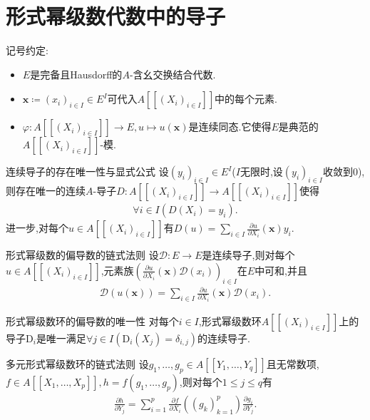 \section{形式幂级数代数中的导子}

记号约定:
\begin{itemize}
	\item $E$是完备且Hausdorff的$A$-含幺交换结合代数.
	\item $\mathbf{x}\coloneq\left(x_{i}\right)_{i\in I}\in E^{I}$可代入$A[[(X_{i})_{i\in I}]]$中的每个元素.
	\item $\varphi:A[[(X_{i})_{i\in I}]]\to E,u\mapsto u\left(\mathbf{x}\right)$是连续同态.它使得$E$是典范的$A[[(X_{i})_{i\in I}]]$-模.
\end{itemize}

\begin{proposition}{连续导子的存在唯一性与显式公式}{}
	设$\left(y_{i}\right)_{i\in I}\in E^{I}$($I$无限时,设$\left(y_{i}\right)_{i\in I}$收敛到$0$),则存在唯一的连续$A$-导子$D:A[[(X_{i})_{i\in I}]]\to A[[(X_{i})_{i\in I}]]$使得
	\begin{align*}
		\forall i\in I\left(D\left(X_{i}\right)=y_{i}\right).
	\end{align*}
	进一步,对每个$u\in A[[(X_{i})_{i\in I}]]$有$D\left(u\right)=\sum\limits_{i\in I}\frac{\partial u}{\partial X_{i}}\left(\mathbf{x}\right)y_{i}$.
\end{proposition}

\begin{corollary}{形式幂级数的偏导数的链式法则}{}
	设$\mathcal{D}:E\to E$是连续导子,则对每个$u\in A[[(X_{i})_{i\in I}]]$,元素族$\left(\frac{\partial u}{\partial X_{i}}\left(\mathbf{x}\right)\mathcal{D}\left(x_{i}\right)\right)_{i\in I}$在$E$中可和,并且
	\begin{align*}
		\mathcal{D}\left(u\left(\mathbf{x}\right)\right)=\sum\limits_{i\in I}\frac{\partial u}{\partial X_{i}}\left(\mathbf{x}\right)\mathcal{D}\left(x_{i}\right).
	\end{align*}
\end{corollary}

\begin{corollary}{形式幂级数环的偏导数的唯一性}{}
	对每个$i\in I$,形式幂级数环$A[[(X_{i})_{i\in I}]]$上的导子$\mathrm{D}_{i}$是唯一满足$\forall j\in I\left(\mathrm{D}_{i}\left(X_{j}\right)=\delta_{i,j}\right)$的连续导子.
\end{corollary}

\begin{corollary}{多元形式幂级数环的链式法则}{}
	设$g_{1},\ldots,g_{p}\in A[[Y_{1},\ldots,Y_{q}]]$且无常数项,$f\in A[[X_{1},\ldots,X_{p}]],h=f\left(g_{1},\ldots,g_{p}\right)$,则对每个$1\leq j\leq q$有
	\begin{align*}
		\frac{\partial h}{\partial Y_{j}}=\sum\limits_{i=1}^{p}\frac{\partial f}{\partial X_{i}}\left(\left(g_{k}\right)_{k=1}^{p}\right)\frac{\partial g_{i}}{\partial Y_{j}}.
	\end{align*}
\end{corollary}

